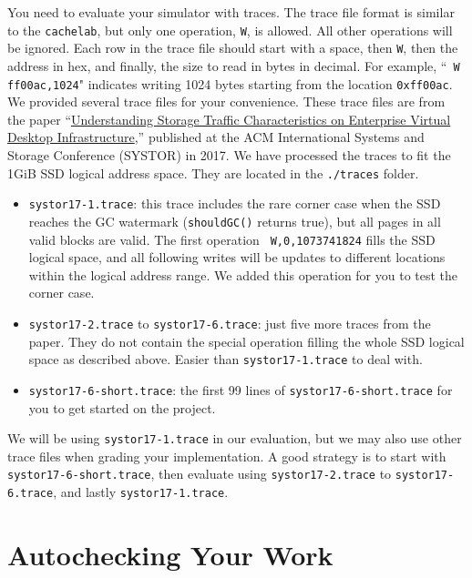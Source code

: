 \documentclass[11pt]{article}
\begin{document}
You need to evaluate your simulator with traces.
The trace file format is similar to the \texttt{cachelab},
but only one operation, \texttt{W}, is allowed.
All other operations will be ignored.
Each row in the trace file should start with a space,
then \texttt{W},
then the address in hex,
and finally, the size to read in bytes in decimal.
For example, 
``\texttt{ W ff00ac,1024}" indicates writing 1024 bytes starting from the location \texttt{0xff00ac}.
\label{sec:traces}
We provided several trace files for your convenience. These trace files are from the paper ``\href{https://dl.acm.org/doi/10.1145/3078468.3078479}{Understanding Storage Traffic Characteristics on Enterprise Virtual Desktop Infrastructure},'' published at the ACM International Systems and Storage Conference (SYSTOR) in 2017. We have processed the traces to fit the 1GiB SSD logical address space. They are located in the \texttt{./traces} folder.
\begin{itemize}
    \item \texttt{systor17-1.trace}: this trace includes the rare corner case when the SSD reaches the GC watermark (\texttt{shouldGC()} returns true), but all pages in all valid blocks are valid. The first operation \texttt{ W,0,1073741824} fills the SSD logical space, and all following writes will be updates to different locations within the logical address range. We added this operation for you to test the corner case.
    \item \texttt{systor17-2.trace} to \texttt{systor17-6.trace}: just five more traces from the paper. They do not contain the special operation filling the whole SSD logical space as described above. Easier than \texttt{systor17-1.trace} to deal with.
    \item \texttt{systor17-6-short.trace}: the first 99 lines of \texttt{systor17-6-short.trace} for you to get started on the project.
\end{itemize}

We will be using \texttt{systor17-1.trace} in our evaluation, but we may also use other trace files when grading your implementation. A good strategy is to start with \texttt{systor17-6-short.trace}, then evaluate using \texttt{systor17-2.trace} to \texttt{systor17-6.trace}, and lastly \texttt{systor17-1.trace}.



\section{Autochecking Your Work}
\end{document}
